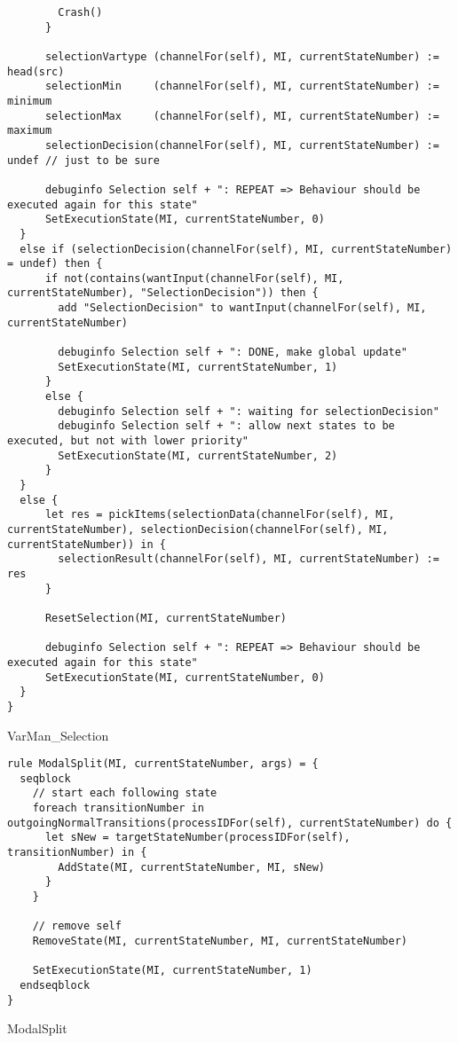 \begin{listing}[H]
\begin{verbatim}
        Crash()
      }

      selectionVartype (channelFor(self), MI, currentStateNumber) := head(src)
      selectionMin     (channelFor(self), MI, currentStateNumber) := minimum
      selectionMax     (channelFor(self), MI, currentStateNumber) := maximum
      selectionDecision(channelFor(self), MI, currentStateNumber) := undef // just to be sure

      debuginfo Selection self + ": REPEAT => Behaviour should be executed again for this state"
      SetExecutionState(MI, currentStateNumber, 0)
  }
  else if (selectionDecision(channelFor(self), MI, currentStateNumber) = undef) then {
      if not(contains(wantInput(channelFor(self), MI, currentStateNumber), "SelectionDecision")) then {
        add "SelectionDecision" to wantInput(channelFor(self), MI, currentStateNumber)

        debuginfo Selection self + ": DONE, make global update"
        SetExecutionState(MI, currentStateNumber, 1)
      }
      else {
        debuginfo Selection self + ": waiting for selectionDecision"
        debuginfo Selection self + ": allow next states to be executed, but not with lower priority"
        SetExecutionState(MI, currentStateNumber, 2)
      }
  }
  else {
      let res = pickItems(selectionData(channelFor(self), MI, currentStateNumber), selectionDecision(channelFor(self), MI, currentStateNumber)) in {
        selectionResult(channelFor(self), MI, currentStateNumber) := res
      }

      ResetSelection(MI, currentStateNumber)

      debuginfo Selection self + ": REPEAT => Behaviour should be executed again for this state"
      SetExecutionState(MI, currentStateNumber, 0)
  }
}
\end{verbatim}
\caption{VarMan_Selection}
\label{lst:asm:VarMan_Selection}
\end{listing}




\begin{listing}[H]
\begin{verbatim}
rule ModalSplit(MI, currentStateNumber, args) = {
  seqblock
    // start each following state
    foreach transitionNumber in outgoingNormalTransitions(processIDFor(self), currentStateNumber) do {
      let sNew = targetStateNumber(processIDFor(self), transitionNumber) in {
        AddState(MI, currentStateNumber, MI, sNew)
      }
    }

    // remove self
    RemoveState(MI, currentStateNumber, MI, currentStateNumber)

    SetExecutionState(MI, currentStateNumber, 1)
  endseqblock
}
\end{verbatim}
\caption{ModalSplit}
\label{lst:asm:ModalSplit}
\end{listing}





